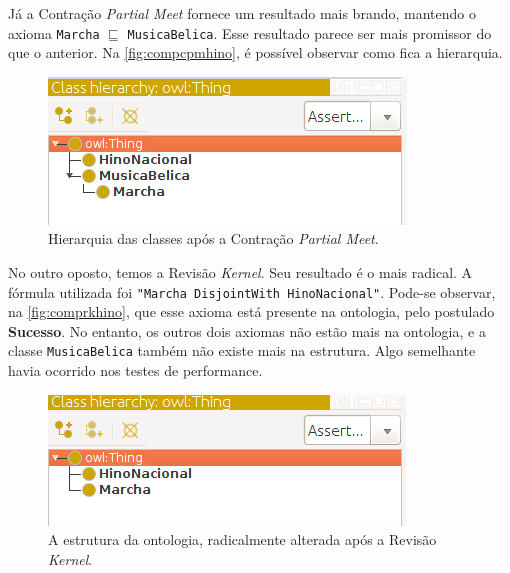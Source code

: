 Já a Contração \textit{Partial Meet} fornece um resultado mais brando, mantendo o axioma \texttt{Marcha} $ \sqsubseteq $ \texttt{MusicaBelica}. Esse resultado parece ser mais promissor do que o anterior. Na \autoref{fig:compcpmhino}, é possível observar como fica a hierarquia.

\begin{figure}[H]
	\centering
	\includegraphics[width=0.5\linewidth]{Capitulos/Testes/compcpmhino}
	\caption{Hierarquia das classes após a Contração \textit{Partial Meet}.}
	\label{fig:compcpmhino}
\end{figure}

No outro oposto, temos a Revisão \textit{Kernel}. Seu resultado é o mais radical. A fórmula utilizada foi \texttt{"Marcha DisjointWith HinoNacional"}. Pode-se observar, na \autoref{fig:comprkhino}, que esse axioma está presente na ontologia, pelo postulado \textbf{Sucesso}. No entanto, os outros dois axiomas não estão mais na ontologia, e a classe \texttt{MusicaBelica} também não existe mais na estrutura. Algo semelhante havia ocorrido nos testes de performance.

\begin{figure}[H]
	\centering
	\includegraphics[width=0.5\linewidth]{Capitulos/Testes/comprkhino}
	\caption{A estrutura da ontologia, radicalmente alterada após a Revisão \textit{Kernel}.}
	\label{fig:comprkhino}
\end{figure}